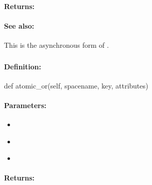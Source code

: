 \paragraph{Returns:}


\paragraph{See also:}  This is the asynchronous form of .

\pagebreak
\subsubsection{}
\label{api:python:atomic_or}


\paragraph{Definition:}
\begin{pythoncode}
def atomic_or(self, spacename, key, attributes)
\end{pythoncode}

\paragraph{Parameters:}
\begin{itemize}[noitemsep]
\item {}\\

\item {}\\

\item {}\\

\end{itemize}

\paragraph{Returns:}


\pagebreak
\subsubsection{}
\label{api:python:async_atomic_or}


